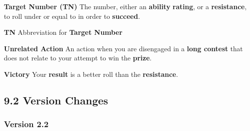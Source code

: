 \documentclass[
]{article}
\begin{document}
\textbf{Target Number (TN)} The number, either an \textbf{ability}
\textbf{rating}, or a \textbf{resistance}, to roll under or equal to in
order to \textbf{succeed}.

\textbf{TN} Abbreviation for \textbf{Target Number}

\textbf{Unrelated Action} An action when you are disengaged in a
\textbf{long contest} that does not relate to your attempt to win the
\textbf{prize}.

\textbf{Victory} Your \textbf{result} is a better roll than the
\textbf{resistance}.

\hypertarget{version-changes}{%
\subsection{9.2 Version Changes}\label{version-changes}}

\hypertarget{version-2.2}{%
\subsubsection{Version 2.2}\label{version-2.2}}
\end{document}

